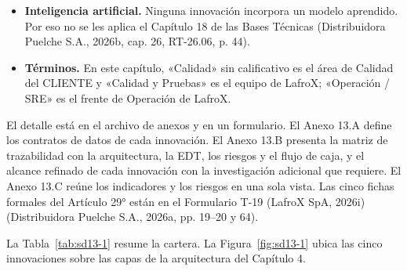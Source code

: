 \begin{itemize}
  \item \textbf{Inteligencia artificial.} Ninguna innovación incorpora un modelo aprendido. Por eso no se les aplica el Capítulo 18 de las Bases Técnicas (Distribuidora Puelche S.A., 2026b, cap. 26, RT-26.06, p. 44).
  \item \textbf{Términos.} En este capítulo, «Calidad» sin calificativo es el área de Calidad del CLIENTE y «Calidad y Pruebas» es el equipo de LafroX; «Operación / SRE» es el frente de Operación de LafroX.
\end{itemize}

El detalle está en el archivo de anexos y en un formulario. El Anexo 13.A define los contratos de datos de cada innovación. El Anexo 13.B presenta la matriz de trazabilidad con la arquitectura, la EDT, los riesgos y el flujo de caja, y el alcance refinado de cada innovación con la investigación adicional que requiere. El Anexo 13.C reúne los indicadores y los riesgos en una sola vista. Las cinco fichas formales del Artículo 29° están en el Formulario T-19 (LafroX SpA, 2026i) (Distribuidora Puelche S.A., 2026a, pp. 19–20 y 64).

La Tabla~\ref{tab:sd13-1} resume la cartera. La Figura~\ref{fig:sd13-1} ubica las cinco innovaciones sobre las capas de la arquitectura del Capítulo 4.

